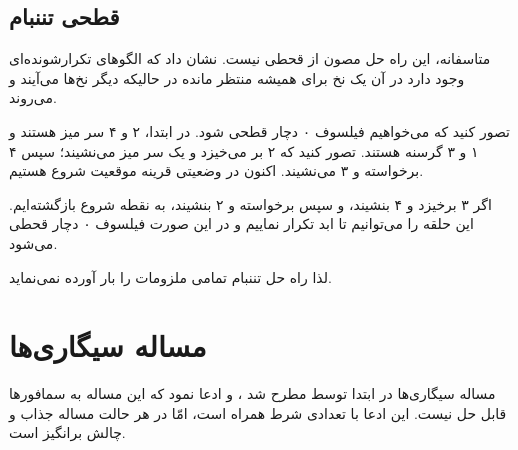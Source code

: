 \documentclass{book}
\newcommand{\clearemptydoublepage}{\newpage\cleardoublepage}
\begin{document}
\clearemptydoublepage
\subsection{قطحی تننبام}

    متاسفانه، این راه حل مصون از قحطی نیست.  نشان داد که الگوهای تکرارشونده‌ای وجود دارد در آن یک نخ برای همیشه منتظر مانده در 
    حالیکه دیگر نخ‌ها می‌آیند و می‌روند\cite{gingras90dining}.

    تصور کنید که می‌خواهیم فیلسوف ۰ دچار قطحی شود. در ابتدا، ۲ و ۴ سر میز هستند و ۱ و ۳ گرسنه هستند. تصور کنید که ۲ بر می‌خیزد و یک سر میز می‌نشیند؛ 
    سپس ۴ برخواسته و ۳ می‌نشیند. اکنون در وضعیتی قرینه موقعیت شروع هستیم. 

    اگر ۳ برخیزد و ۴ بنشیند، و سپس  برخواسته و ۲ بنشیند، به نقطه شروع بازگشته‌ایم. 
    این  حلقه را می‌توانیم تا ابد تکرار نماییم و در این صورت فیلسوف ۰ دچار قحطی می‌شود. 

    لذا راه حل تننبام تمامی ملزومات را بار آورده نمی‌نماید. 


\clearemptydoublepage
\section {مساله سیگاری‌ها}

    مساله سیگاری‌ها در ابتدا توسط      مطرح شد \cite{patil}، و ادعا نمود که  این مساله به سمافورها قابل حل نیست. 
    این ادعا با تعدادی شرط همراه است، امّا در هر حالت مساله جذاب و چالش برانگیز است. 
\end{document}
